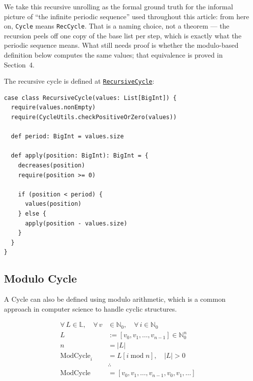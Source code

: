 We take this recursive unrolling as the formal ground truth for the informal
picture of ``the infinite periodic sequence'' used throughout this article:
from here on, \texttt{Cycle} means \texttt{RecCycle}. That is a naming choice,
not a theorem --- the recursion peels off one copy of the base list per step,
which is exactly what the periodic sequence means. What still needs proof is
whether the modulo-based definition below computes the same values; that
equivalence is proved in Section~4.

The recursive cycle is defined at
\href{https://github.com/thiagomata/prime-numbers/blob/cycle-article-v1.0.0/src/main/scala/v1/chapter4/cycle/recursive/RecursiveCycle.scala}{\texttt{RecursiveCycle}}:

\begin{lstlisting}[style=scala]
case class RecursiveCycle(values: List[BigInt]) {
  require(values.nonEmpty)
  require(CycleUtils.checkPositiveOrZero(values))

  def period: BigInt = values.size

  def apply(position: BigInt): BigInt = {
    decreases(position)
    require(position >= 0)

    if (position < period) {
      values(position)
    } else {
      apply(position - values.size)
    }
  }
}
\end{lstlisting}

\subsection{Modulo Cycle}

A Cycle can also be defined using modulo arithmetic, which is a common approach
in computer science to handle cyclic structures.

\begin{equation*}
\begin{aligned}
\forall\, L\in\mathbb{L},\quad \forall\, v&\in\mathbb{N}_0,
  \quad \forall\, i\in\mathbb{N}_0 \\
L &:= [v_0,v_1,\dots,v_{n-1}]\in\mathbb{N}_0^n \\
n &= |L| \\
\operatorname{ModCycle}_i &= L[i\operatorname{mod}n],\quad |L|>0 \\
&\therefore \\
\operatorname{ModCycle}
  &= [v_0,v_1,\dots,v_{n-1},v_0,v_1,\dots]
\end{aligned}
\end{equation*}


